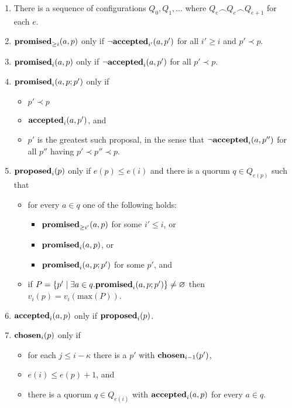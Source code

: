 \documentclass[journal]{IEEEtran}
\begin{document}
\begin{enumerate}

\item\label{paxos-quorums} There is a sequence of configurations $Q_0, Q_1,
\ldots$ where ${Q_e \frown Q_e \frown Q_{e+1}}$ for each $e$.

\item\label{paxos-mprom} $\mathbf{promised}_{\ge i}(a,p)$ only if $\neg\mathbf{accepted}_{i'}(a,p')$ for
all $i' \ge i$ and $p' \prec p$.

\item\label{paxos-fprom} $\mathbf{promised}_{i}(a,p)$ only if $\neg\mathbf{accepted}_{i}(a,p')$ for all
$p' \prec p$.

\item\label{paxos-bprom} $\mathbf{promised}_{i}(a,p;p')$ only if \begin{itemize} \item
$p' \prec p$ \item $\mathbf{accepted}_{i}(a,p')$, and \item $p'$ is the greatest such
proposal, in the sense that $\neg \mathbf{accepted}_{i}(a,p'')$ for all $p''$ having $p'
\prec p'' \prec p$. \end{itemize}

\item\label{paxos-prop} $\mathbf{proposed}_{i}(p)$ only if $e(p) \le e(i)$ and there is a
quorum $q \in Q_{e(p)}$ such that
\begin{itemize}
\item for every $a \in q$ one of the following holds:
%
\begin{itemize}
\item $\mathbf{promised}_{\ge i'}(a,p)$ for some $i' \le i$, or
\item $\mathbf{promised}_{i}(a,p)$, or
\item $\mathbf{promised}_{i}(a,p;p')$ for some $p'$, and
\end{itemize}

\item if $P = \{ p' \mid \exists a \in q. \mathbf{promised}_{i}(a,p;p') \} \ne
\varnothing$ then $v_i(p) = v_i(\mathrm{max}(P))$.

\end{itemize}

\item \label{paxos-acc} $\mathbf{accepted}_{i}(a,p)$ only if $\mathbf{proposed}_{i}(p)$.

\item \label{paxos-chosen} $\mathbf{chosen}_{i}(p)$ only if \begin{itemize} \item for
each $j \le i - \kappa$ there is a $p'$ with $\mathbf{chosen}_{i-1}(p')$, \item $e(i)
\le e(p) + 1$, and \item there is a quorum $q \in Q_{e(i)}$ with
$\mathbf{accepted}_{i}(a,p)$ for every $a \in q$.  \end{itemize}

\end{enumerate}
\end{document}
